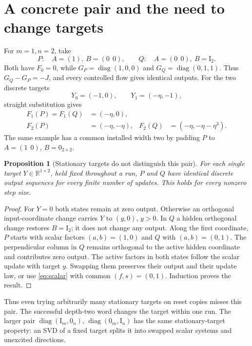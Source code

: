 \documentclass[11pt]{article}
\newtheorem{proposition}[theorem]{Proposition}
\theoremstyle{remark}\newtheorem{remark}[theorem]{Remark}
\newcommand{\R}{\mathbb R}
\newcommand{\Id}{\mathrm I}
\newcommand{\diag}{\operatorname{diag}}
\begin{document}
\section{A concrete pair and the need to change targets}
For $m=1,n=2$, take
\[
 P:\quad A=(1),\ B=(0\ \ 0),\qquad
 Q:\quad A=(0\ \ 0),\ B=\Id_2.
\]
Both have $F_0=0$, while
$G_P=\diag(1,0,0)$ and $G_Q=\diag(0,1,1)$.
Thus $G_Q-G_P=-J$, and every controlled flow gives identical outputs.
For the two discrete targets
\[
 Y_0=(-1,0),\qquad Y_1=(-\eta,-1),
\]
straight substitution gives
\begin{align*}
 F_1(P)=F_1(Q)&=(-\eta,0),\\
 F_2(P)&=(-\eta,-\eta),&
 F_2(Q)&=(-\eta,-\eta-\eta^3).
\end{align*}
The same example has a common installed width two by padding $P$ to
$A=(1\ \ 0)$, $B=0_{2\times2}$.

\begin{proposition}[Stationary targets do not distinguish this pair]
For each single target $Y\in\R^{1\times2}$, held fixed throughout a run,
$P$ and $Q$ have identical discrete output sequences for every finite
number of updates. This holds for every nonzero step size.
\end{proposition}
\begin{proof}
For $Y=0$ both states remain at zero output. Otherwise an orthogonal
input-coordinate change carries $Y$ to $(y,0)$, $y>0$. In $Q$ a hidden
orthogonal change restores $B=\Id_2$; it does not change any output.
Along the first coordinate, $P$ starts with scalar factors $(a,b)=(1,0)$
and $Q$ with $(a,b)=(0,1)$. The perpendicular column in $Q$ remains
orthogonal to the active hidden coordinate and contributes zero output.
The active factors in both states follow the scalar update with target
$y$. Swapping them preserves their output and their update law, or use
\eqref{eq:scalar} with common $(f,s)=(0,1)$. Induction proves the result.
\end{proof}
Thus even trying arbitrarily many stationary targets on reset copies
misses this pair. The successful depth-two word changes the target within
one run. The larger pair
$\diag(\Id_m,0_n)$, $\diag(0_m,\Id_n)$ has the same stationary-target
property: an SVD of a fixed target splits it into swapped scalar systems
and unexcited directions.
\end{document}

